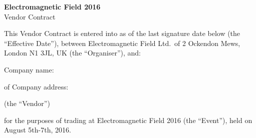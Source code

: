 

\selectfont

\begin{center}
{\bf \LARGE Electromagnetic Field 2016}\\[12pt]
{\Large Vendor Contract}
\end{center}

This Vendor Contract is entered into as of the last signature date below (the ``Effective Date''), between
Electromagnetic Field Ltd.\ of 2 Ockendon Mews, London N1 3JL, UK (the ``Organiser''), and:

Company name:
\vspace{0.3in}
\par\noindent\makebox[5in]{\hrulefill}

of
Company address:
\vspace{0.3in}
\par\noindent\makebox[5in]{\hrulefill}

(the ``Vendor'')

for the purposes of trading at Electromagnetic Field 2016 (the ``Event''), held on August 5th-7th, 2016.

